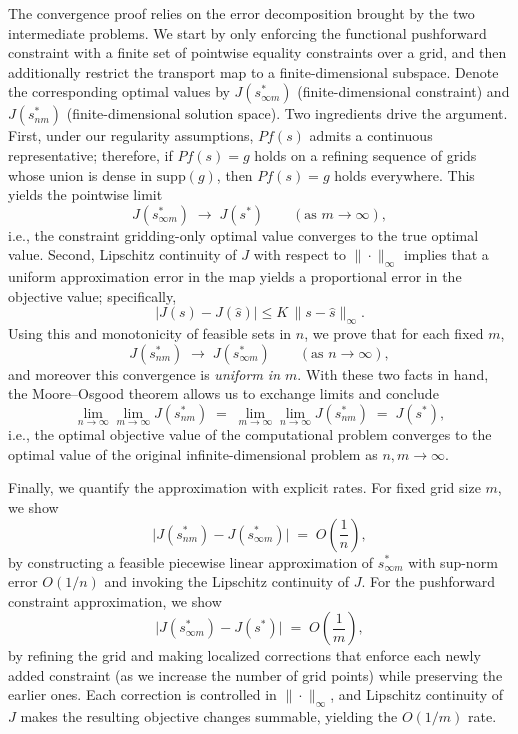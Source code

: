\documentclass[12pt,leqno]{amsart}
\begin{document}
\begin{enumerate}[leftmargin=*, label=\arabic*.]
The convergence proof relies on the error decomposition brought by the two intermediate problems. We start by only enforcing the functional
pushforward constraint with a finite set of pointwise equality constraints over a grid, and then additionally restrict the transport map to a finite-dimensional subspace. Denote the corresponding optimal values by
$J(s_{\infty m}^*)$ (finite-dimensional constraint) and $J(s_{nm}^*)$ (finite-dimensional solution space). Two ingredients drive the argument. First, under our regularity assumptions, $Pf(s)$ admits a continuous representative; therefore,
if $Pf(s)=g$ holds on a refining sequence of grids whose union is dense in $\mathrm{supp}(g)$, then $Pf(s)=g$ holds everywhere. This yields
the pointwise limit
\[
J(s_{\infty m}^*)\;\longrightarrow\;J(s^*)\qquad (\text{as }m\to\infty),
\]
i.e., the constraint gridding-only optimal value converges to the true optimal value. Second, Lipschitz continuity of $J$ with respect to $\|\cdot\|_{\infty}$ implies that a uniform approximation error in the map yields a proportional error in the objective value; specifically,
\[
|J(s)-J(\hat s)| \le K\,\|s-\hat s\|_{\infty} .
\] Using this and monotonicity of feasible sets in $n$,
we prove that for each fixed $m$,
\[
J(s_{nm}^*)\;\longrightarrow\;J(s_{\infty m}^*)\qquad (\text{as }n\to\infty),
\]
and moreover this convergence is \emph{uniform in $m$}. With these two facts in hand, the Moore--Osgood theorem allows us to exchange limits and conclude
\[
\lim_{n\to\infty}\lim_{m\to\infty} J(s_{nm}^*)
\;=\;
\lim_{m\to\infty}\lim_{n\to\infty} J(s_{nm}^*)
\;=\;
J(s^*),
\]
i.e., the optimal objective value of the computational problem converges to the optimal value of the original infinite-dimensional problem
as $n,m\to\infty$.


Finally, we quantify the approximation with explicit rates. For fixed grid size $m$, we show
\[
\big|J(s_{nm}^*)-J(s_{\infty m}^*)\big|\;=\;O\!\left(\frac{1}{n}\right),
\]
by constructing a feasible piecewise linear approximation of $s_{\infty m}^*$ with sup-norm error $O(1/n)$ and invoking the
Lipschitz continuity of $J$. For the pushforward constraint approximation, we show
\[
\big|J(s_{\infty m}^*)-J(s^*)\big|\;=\;O\!\left(\frac{1}{m}\right),
\]
by refining the grid and making localized corrections that enforce each newly added constraint (as we increase the number of grid points) while preserving the earlier ones. Each correction is controlled in $\|\cdot\|_{\infty}$, and Lipschitz continuity of $J$ makes the resulting objective changes summable, yielding the
$O(1/m)$ rate.


\end{enumerate}
\end{document}
